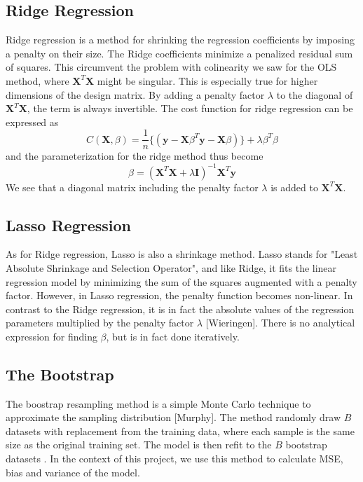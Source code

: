 \documentclass{article}
\begin{document}
\subsection{Ridge Regression}
Ridge regression is a method for shrinking the regression coefficients by imposing a penalty on their size. The Ridge coefficients minimize a penalized residual sum of squares. This circumvent the problem with colinearity we saw for the OLS method, where $\textbf{X}^{T}\textbf{X}$ might be singular. This is especially true for higher dimensions of the design matrix. By adding a penalty factor $\lambda$ to the diagonal of $\textbf{X}^{T}\textbf{X}$, the term is always invertible. The cost function for ridge regression can be expressed as
\begin{equation}
C(\textbf{X},\beta) = \dfrac{1}{n} \{( \textbf{y}-\textbf{X}\beta^{T}\textbf{y}-\textbf{X}\beta)\} + \lambda \beta^{T} \beta 
\end{equation}
and the parameterization for the ridge method thus become
\begin{equation}
\beta = (\textbf{X}^{T}\textbf{X} + \lambda\textbf{I})^{-1}\textbf{X}^{T}\textbf{y}
\end{equation}
We see that a diagonal matrix including the penalty factor $\lambda$ is added to $\textbf{X}^{T}\textbf{X}$. 
\subsection{Lasso Regression}
As for Ridge regression, Lasso is also a shrinkage method. Lasso stands for "Least Absolute Shrinkage and Selection Operator", and like Ridge, it fits the linear regression model by minimizing the sum of the squares augmented with a penalty factor. However, in Lasso regression, the penalty function becomes non-linear. In contrast to the Ridge regression, it is in fact the absolute values of the regression parameters multiplied by the penalty factor $\lambda$ [Wieringen]. There is no analytical expression for finding $\beta$, but is in fact done iteratively. 
\subsection{The Bootstrap}
The boostrap resampling method is a simple Monte Carlo technique to approximate the sampling distribution [Murphy]. The method randomly draw $B$ datasets with replacement from the training data, where each sample is the same size as the original training set. The model is then refit to the $B$ bootstrap datasets \cite{Hastie et al.}. In the context of this project, we use this method to calculate MSE, bias and variance of the model.
\end{document}
